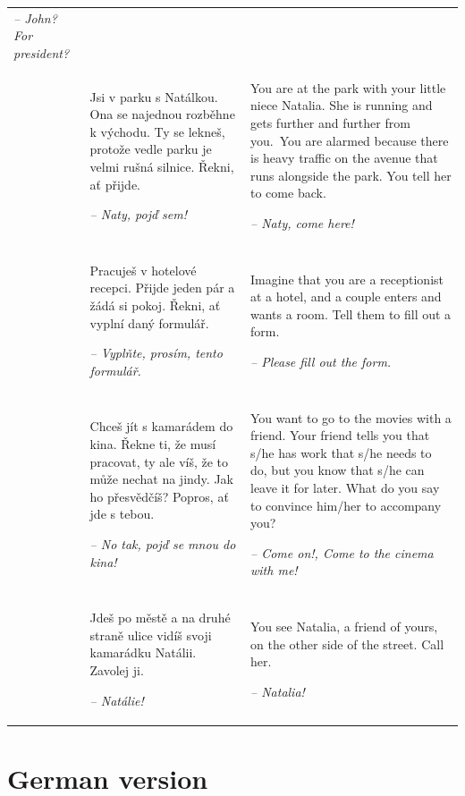 \begin{xltabular}{\textwidth}{lQQ}
{\itshape -- John? For president?}\\
 & Jsi v parku s Natálkou. Ona se najednou rozběhne k východu. Ty se lekneš, protože vedle parku je velmi rušná silnice. Řekni, ať přijde.

{\itshape -- Naty, pojď sem!} & You are at the park with your little niece Natalia. She is running and gets further and further from you.~You are alarmed because there is heavy traffic on the avenue that runs alongside the park. You tell her to come back.

{\itshape -- Naty, come here!}\\
 & Pracuješ v hotelové recepci. Přijde jeden pár a žádá si pokoj. Řekni, ať vyplní daný formulář.

{\itshape -- Vyplňte, prosím, tento formulář.} & Imagine that you are a receptionist at a hotel, and a couple enters and wants a room. Tell them to fill out a form.

{\itshape -- Please fill out the form.}\\
 & Chceš jít s kamarádem do kina. Řekne ti, že musí pracovat, ty ale víš, že to může nechat na jindy. Jak ho přesvědčíš? Popros, ať jde s tebou.

{\itshape -- No tak, pojď se mnou do kina!} & You want to go to the movies with a friend. Your friend tells you that s/he has work that s/he needs to do, but you know that s/he can leave it for later. What do you say to convince him/her to accompany you?

{\itshape -- Come on!, Come to the cinema with me!}\\
 & Jdeš po městě a na druhé straně ulice vidíš svoji kamarádku Natálii. Zavolej ji.

\textit{-- Natálie!} & You see Natalia, a friend of yours, on the other side of the street. Call her.

\textit{-- Natalia!}\\
\end{xltabular}

\newpage
\section{German version}\label{app:a4}


